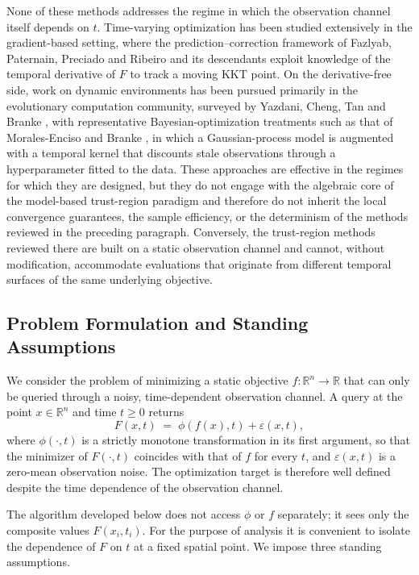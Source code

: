 \documentclass[11pt,a4paper]{article}
\newcommand{\R}{\mathbb{R}}
\begin{document}
None of these methods addresses the regime in which the observation
channel itself depends on $t$. Time-varying optimization has been
studied extensively in the gradient-based setting, where the
prediction--correction framework of Fazlyab, Paternain, Preciado and
Ribeiro \cite{Fazlyab2018} and its descendants exploit knowledge of
the temporal derivative of $F$ to track a moving KKT point. On the
derivative-free side, work on dynamic environments has been pursued
primarily in the evolutionary computation community, surveyed by
Yazdani, Cheng, Tan and Branke \cite{Yazdani2024}, with
representative Bayesian-optimization treatments such as that of
Morales-Enciso and Branke \cite{MoralesEnciso2015}, in which a
Gaussian-process model is augmented with a temporal kernel that
discounts stale observations through a hyperparameter fitted to the
data. These approaches are effective in the regimes for which they
are designed, but they do not engage with the algebraic core of the
model-based trust-region paradigm and therefore do not inherit the
local convergence guarantees, the sample efficiency, or the
determinism of the methods reviewed in the preceding paragraph.
Conversely, the trust-region methods reviewed there are built on a
static observation channel and cannot, without modification,
accommodate evaluations that originate from different temporal
surfaces of the same underlying objective.

\subsection{Problem Formulation and Standing Assumptions}
\label{sec:formulation}

We consider the problem of minimizing a static objective
$f:\R^n\to\R$ that can only be queried through a noisy,
time-dependent observation channel.  A query at the point
$x\in\R^n$ and time $t\ge 0$ returns
\begin{equation}\label{eq:obs-model}
  F(x,t) \;=\; \phi(f(x), t) + \varepsilon(x, t),
\end{equation}
where $\phi(\cdot, t)$ is a strictly monotone transformation in its
first argument, so that the minimizer of $F(\cdot, t)$ coincides with
that of $f$ for every $t$, and $\varepsilon(x,t)$ is a zero-mean
observation noise. The optimization target is therefore well defined
despite the time dependence of the observation channel.

The algorithm developed below does not access $\phi$ or $f$ separately;
it sees only the composite values $F(x_i, t_i)$.  For the purpose of
analysis it is convenient to isolate the dependence of $F$ on $t$ at a
fixed spatial point.  We impose three standing assumptions.
\end{document}
